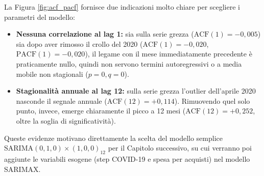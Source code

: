 La Figura \ref{fig:acf_pacf} fornisce due indicazioni molto chiare per scegliere i parametri del modello:
\begin{itemize}
    \item \textbf{Nessuna correlazione al lag 1:} sia sulla serie grezza ($\mathrm{ACF}(1) = -0,005$) sia dopo aver rimosso il crollo del 2020 ($\mathrm{ACF}(1) = -0,020$, $\mathrm{PACF}(1) = -0,020$), il legame con il mese immediatamente precedente è praticamente nullo, quindi non servono termini autoregressivi o a media mobile non stagionali ($p = 0, q = 0$).
    \item \textbf{Stagionalità annuale al lag 12:} sulla serie grezza l'outlier dell'aprile 2020 nasconde il segnale annuale ($\mathrm{ACF}(12) = +0,114$). Rimuovendo quel solo punto, invece, emerge chiaramente il picco a 12 mesi ($\mathrm{ACF}(12) = +0,252$, oltre la soglia di significatività).
\end{itemize}

Queste evidenze motivano direttamente la scelta del modello semplice \textbf{$\mathrm{SARIMA}(0, 1, 0) \times (1, 0, 0)_{12}$} per il Capitolo successivo, su cui verranno poi aggiunte le variabili esogene (step COVID-19 e spesa per acquisti) nel modello SARIMAX.

